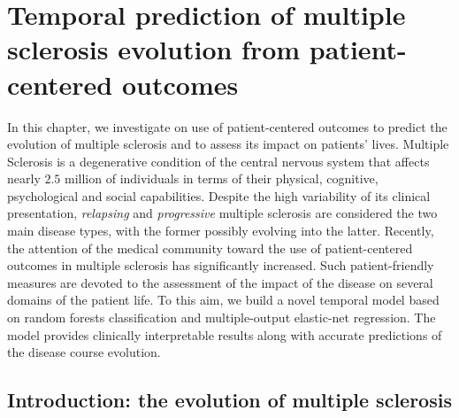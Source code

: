 
\chapter{Temporal prediction of multiple sclerosis evolution from patient-centered outcomes} \label{chap:aism}

\begin{displayquote}
	In this chapter, we investigate on
	use of patient-centered outcomes to predict the evolution of multiple sclerosis and to assess its impact on patients' lives.
	Multiple Sclerosis is a degenerative condition of the central nervous system that affects nearly $2.5$ million of individuals in terms of their physical, cognitive, psychological and social capabilities. Despite the high variability of its clinical presentation, \textit{relapsing} and \textit{progressive} multiple sclerosis are considered the two main disease types, with the former possibly evolving into the latter.
	Recently, the attention of the medical community toward the use of patient-centered outcomes in multiple sclerosis has significantly increased. Such patient-friendly measures are devoted to the assessment of the impact of the disease on several domains of the patient life.
	To this aim, we build a novel temporal model based on random forests classification and multiple-output elastic-net regression. The model
	provides clinically interpretable results along with accurate predictions of the disease course evolution.
\end{displayquote}

\section{Introduction: the evolution of multiple sclerosis} \label{sec:aism_intro}


